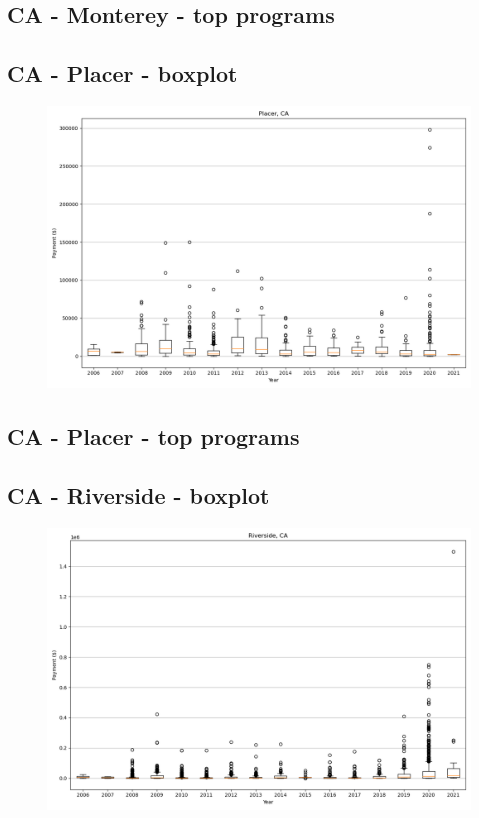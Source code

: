 \subsection*{CA - Monterey - top programs}

\newpage
\subsection*{CA - Placer - boxplot}
\begin{figure}[h]
\centering
\includegraphics[width=7in]{../output/boxplots/counties/Placer-CA_boxplot.png}
\end{figure}


\subsection*{CA - Placer - top programs}

\newpage
\subsection*{CA - Riverside - boxplot}
\begin{figure}[h]
\centering
\includegraphics[width=7in]{../output/boxplots/counties/Riverside-CA_boxplot.png}
\end{figure}


